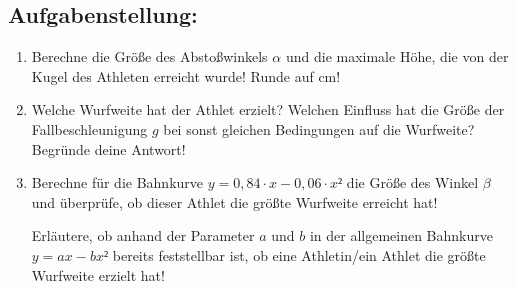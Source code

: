 \begin{langesbeispiel}
\subsection{Aufgabenstellung:}
\begin{enumerate}
	\item Berechne die Größe des Abstoßwinkels $\alpha$ und die maximale Höhe, die von der Kugel des Athleten erreicht wurde! Runde auf cm!
	
	\item Welche Wurfweite hat der Athlet erzielt? Welchen Einfluss hat die Größe der Fallbeschleunigung $g$ bei sonst gleichen Bedingungen auf die Wurfweite? Begründe deine Antwort!
	
	\item Berechne für die Bahnkurve $y=0,84\cdot x-0,06\cdot x²$ die Größe des Winkel $\beta$ und überprüfe, ob dieser Athlet die größte Wurfweite erreicht hat!
	
	Erläutere, ob anhand der Parameter $a$ und $b$ in der allgemeinen Bahnkurve $y=ax-bx²$ bereits feststellbar ist, ob eine Athletin/ein Athlet die größte Wurfweite erzielt hat!	
						\end{enumerate}\leer
				
\end{langesbeispiel}
